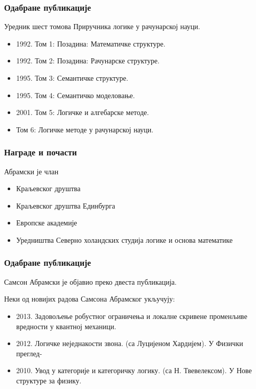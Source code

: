 \documentclass{beamer}
\begin{document}
\begin{frame}
\frametitle{Одабране публикације}
Уредник шест томова Приручника логике у рачунарској науци. 
\begin{itemize}
\item     1992. Том 1: Позадина: Математичке структуре.
\item     1992. Том 2: Позадина: Рачунарске структуре.
\item     1995. Том 3: Семантичке структуре.
\item     1995. Том 4: Семантичко моделовање.
\item     2001. Том 5: Логичке и алгебарске методе.
\item 	  Том 6: Логичке методе у рачунарској науци.
\end{itemize}
\end{frame}

\begin{frame}
\frametitle{Награде и почасти}
Абрамски је члан
\begin{itemize}
\item Краљевског друштва
\item Краљевског друштва Единбурга
\item Европске академије
\item Уредништва Северно холандских студија логике и основа математике
\end{itemize}
\end{frame}


\begin{frame}
\frametitle{Одабране публикације}
Самсон Абрамски је објавио преко двеста публикација.

Неки од новијих радова Самсона Абрамског укључују: 

\begin{itemize}

\item    2013. Задовољење робустног ограничења и локалне скривене променљиве вредности у квантној механици.
\item    2012. Логичке неједнакости звона. (са Луцијеном Хардијем). У Физички преглед-
\item    2010. Увод у категорије и категоричку логику. (са Н. Твевелексом). У Нове структуре за физику. 

\end{itemize}
\end{frame}
\end{document}
